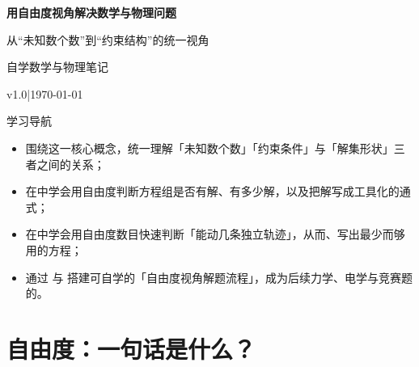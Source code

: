 \documentclass[a4paper,11pt]{ctexart}
\renewcommand{\notetitle}{用自由度视角解决数学与物理问题}
\renewcommand{\noteauthor}{自学数学与物理笔记}
\renewcommand{\notedate}{\today}
\renewcommand{\notesubtitle}{从“未知数个数”到“约束结构”的统一视角}
\renewcommand{\noteversion}{v1.0}
\begin{document}
\thispagestyle{empty}
\setcounter{page}{1}

\noindent
\begin{minipage}[t][0.7\textheight][c]{\textwidth}
  \raggedleft
  \vspace*{\fill}
  {\sffamily\bfseries\Huge\color{accent}\notetitle\par}
  \vspace{0.6em}
  {\Large\color{inkgray}\notesubtitle\par}
  \vspace{0.5em}
  {\large\color{inkgray}\noteauthor\par}
  \vspace{0.4em}
  {\normalsize\color{inkgray}\noteversion\quad|\quad\notedate\par}
  \vspace*{\fill}
\end{minipage}

\begin{center}
\begin{minipage}{0.84\textwidth}
  \textcolor{inkgray}{\sffamily\small 学习导航}\\
  \begin{itemize}
    \item 围绕这一核心概念，统一理解「未知数个数」「约束条件」与「解集形状」三者之间的关系；
    \item 在中学会用自由度判断方程组是否有解、有多少解，以及把解写成工具化的通式；
    \item 在中学会用自由度数目快速判断「能动几条独立轨迹」，从而、写出最少而够用的方程；
    \item 通过 与  搭建可自学的「自由度视角解题流程」，成为后续力学、电学与竞赛题的。
  \end{itemize}
\end{minipage}
\end{center}
\vspace{1em}

\clearpage
\thispagestyle{plain}
\tableofcontents

\clearpage
\section{自由度：一句话是什么？}
\end{document}
